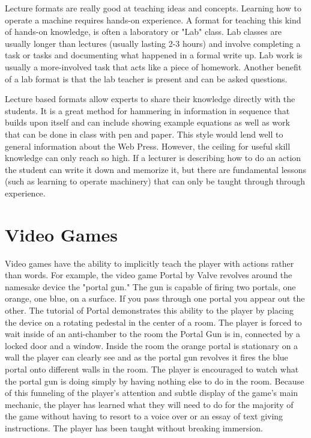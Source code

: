 \documentclass[onecolumn, draftclsnofoot,10pt, compsoc]{IEEEtran}
\begin{document}
Lecture formats are really good at teaching ideas and concepts. Learning how to operate a machine requires hands-on experience. A format for teaching this kind of hands-on knowledge, is often a laboratory or "Lab" class. Lab classes are usually longer than lectures (usually lasting 2-3 hours) and involve completing a task or tasks and documenting what happened in a formal write up. Lab work is usually a more-involved task that acts like a piece of homework. Another benefit of a lab format is that the lab teacher is present and can be asked questions.

Lecture based formats allow experts to share their knowledge directly with the students. It is a great method for hammering in information in sequence that builds upon itself and can include showing example equations as well as work that can be done in class with pen and paper. This style would lend well to general information about the Web Press. However, the ceiling for useful skill knowledge can only reach so high. If a lecturer is describing how to do an action the student can write it down and memorize it, but there are fundamental lessons (such as learning to operate machinery) that can only be taught through through experience.

\section{Video Games}
Video games have the ability to implicitly teach the player with actions rather than words. For example, the video game Portal by Valve revolves around the namesake device the "portal gun." The gun is capable of firing two portals, one orange, one blue, on a surface. If you pass through one portal you appear out the other. The tutorial of Portal demonstrates this ability to the player by placing the device on a rotating pedestal in the center of a room. The player is forced to wait inside of an anti-chamber to the room the Portal Gun is in, connected by a locked door and a window. Inside the room the orange portal is stationary on a wall the player can clearly see and as the portal gun revolves it fires the blue portal onto different walls in the room. The player is encouraged to watch what the portal gun is doing simply by having nothing else to do in the room. Because of this funneling of the player's attention and subtle display of the game's main mechanic, the player has learned what they will need to do for the majority of the game without having to resort to a voice over or an essay of text giving instructions. The player has been taught without breaking immersion. \cite{portal}
\end{document}
